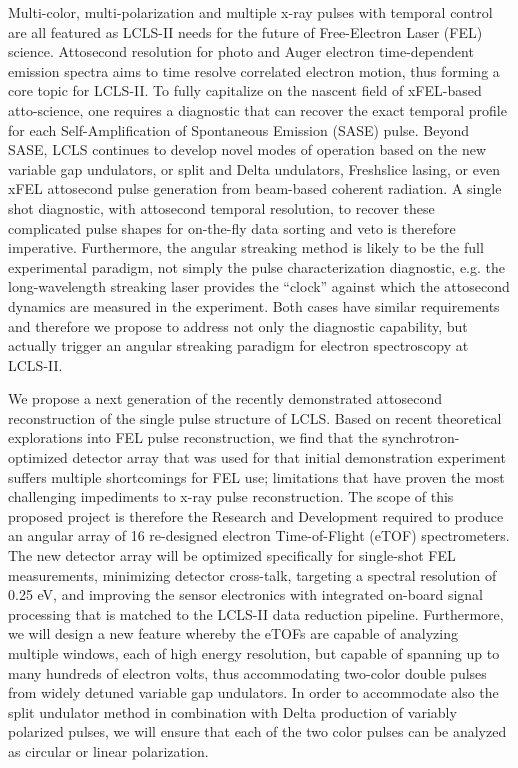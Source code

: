 Multi-color, multi-polarization and multiple x-ray pulses with temporal control are all featured as LCLS-II needs for the future of Free-Electron Laser (FEL) science. 
Attosecond resolution for photo and Auger electron time-dependent emission spectra aims to time resolve correlated electron motion, thus forming a core topic for LCLS-II. 
To fully capitalize on the nascent field of xFEL-based atto-science, one requires a diagnostic that can recover the exact temporal profile for each Self-Amplification of Spontaneous Emission (SASE) pulse.
Beyond SASE, LCLS continues to develop novel modes of operation based on the new variable gap undulators, or split and Delta undulators, Freshslice lasing, or even xFEL attosecond pulse generation from beam-based coherent radiation. 
A single shot diagnostic, with attosecond temporal resolution, to recover these complicated pulse shapes for on-the-fly data sorting and veto is therefore imperative.
Furthermore, the angular streaking method is likely to be the full experimental paradigm, not simply the pulse characterization diagnostic, e.g. the long-wavelength streaking laser provides the ``clock'' against which the attosecond dynamics are measured in the experiment.
Both cases have similar requirements and therefore we propose to address not only the diagnostic capability, but actually trigger an angular streaking paradigm for electron spectroscopy at LCLS-II.
 
We propose a next generation of the recently demonstrated attosecond reconstruction of the single pulse structure of LCLS.
Based on recent theoretical explorations into FEL pulse reconstruction, we find that the synchrotron-optimized detector array that was used for that initial demonstration experiment suffers multiple shortcomings for FEL use; limitations that have proven the most challenging impediments to x-ray pulse reconstruction.
The scope of this proposed project is therefore the Research and Development required to produce an angular array of 16 re-designed electron Time-of-Flight (eTOF) spectrometers. 
The new detector array will be optimized specifically for single-shot FEL measurements, minimizing detector cross-talk, targeting a spectral resolution of 0.25 eV, and improving the sensor electronics with integrated on-board signal processing that is matched to the LCLS-II data reduction pipeline.
Furthermore, we will design a new feature whereby the eTOFs are capable of analyzing multiple windows, each of high energy resolution, but capable of spanning up to many hundreds of electron volts, thus accommodating two-color double pulses from widely detuned variable gap undulators.
In order to accommodate also the split undulator method in combination with Delta production of variably polarized pulses, we will ensure that each of the two color pulses can be analyzed as circular or linear polarization.

